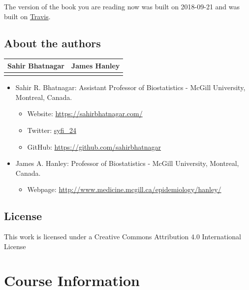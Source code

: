 \documentclass[]{book}
\providecommand{\tightlist}{%
  \setlength{\itemsep}{0pt}\setlength{\parskip}{0pt}}
\providecommand{\tightlist}{%
  \setlength{\itemsep}{0pt}\setlength{\parskip}{0pt}}
\theoremstyle{definition}
\theoremstyle{definition}
\theoremstyle{definition}
\theoremstyle{remark}
\begin{document}
The version of the book you are reading now was built on 2018-09-21 and
was built on
\href{https://travis-ci.org/sahirbhatnagar/MATH697}{Travis}.

\section{About the authors}\label{about-the-authors}

\begin{longtable}[]{@{}cc@{}}
\toprule
Sahir Bhatnagar & James Hanley\tabularnewline
\midrule
\endhead
&\tabularnewline
\bottomrule
\end{longtable}

\begin{itemize}
\tightlist
\item
  Sahir R. Bhatnagar: Assistant Professor of Biostatistics - McGill
  University, Montreal, Canada.

  \begin{itemize}
  \tightlist
  \item
    Website: \url{https://sahirbhatnagar.com/}\\
  \item
    Twitter: \href{https://twitter.com/syfi_24}{syfi\_24}\\
  \item
    GitHub: \url{https://github.com/sahirbhatnagar}\\
  \end{itemize}
\item
  James A. Hanley: Professor of Biostatistics - McGill University,
  Montreal, Canada.

  \begin{itemize}
  \tightlist
  \item
    Webpage: \url{http://www.medicine.mcgill.ca/epidemiology/hanley/}
  \end{itemize}
\end{itemize}

\section{License}\label{license}

This work is licensed under a Creative Commons Attribution 4.0
International License

\chapter{Course Information}\label{course-information}
\end{document}
